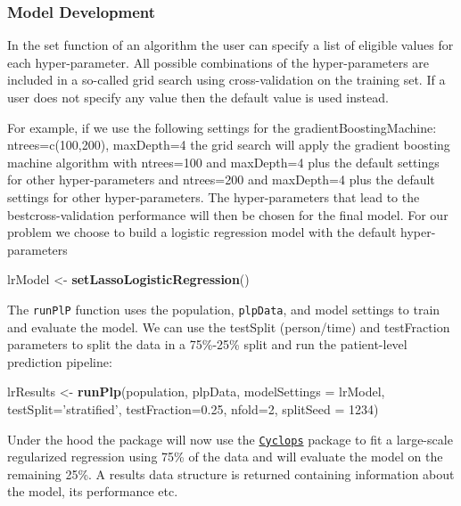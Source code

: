 \documentclass[
]{article}
\newenvironment{Shaded}{\begin{snugshade}}{\end{snugshade}}
\newcommand{\DataTypeTok}[1]{\textcolor[rgb]{0.13,0.29,0.53}{#1}}
\newcommand{\DecValTok}[1]{\textcolor[rgb]{0.00,0.00,0.81}{#1}}
\newcommand{\FloatTok}[1]{\textcolor[rgb]{0.00,0.00,0.81}{#1}}
\newcommand{\KeywordTok}[1]{\textcolor[rgb]{0.13,0.29,0.53}{\textbf{#1}}}
\newcommand{\NormalTok}[1]{#1}
\newcommand{\StringTok}[1]{\textcolor[rgb]{0.31,0.60,0.02}{#1}}
\begin{document}
\hypertarget{model-development}{%
\subsubsection{Model Development}\label{model-development}}

In the set function of an algorithm the user can specify a list of
eligible values for each hyper-parameter. All possible combinations of
the hyper-parameters are included in a so-called grid search using
cross-validation on the training set. If a user does not specify any
value then the default value is used instead.

For example, if we use the following settings for the
gradientBoostingMachine: ntrees=c(100,200), maxDepth=4 the grid search
will apply the gradient boosting machine algorithm with ntrees=100 and
maxDepth=4 plus the default settings for other hyper-parameters and
ntrees=200 and maxDepth=4 plus the default settings for other
hyper-parameters. The hyper-parameters that lead to the
bestcross-validation performance will then be chosen for the final
model. For our problem we choose to build a logistic regression model
with the default hyper-parameters

\begin{Shaded}
\begin{Highlighting}[]
\NormalTok{lrModel <-}\StringTok{ }\KeywordTok{setLassoLogisticRegression}\NormalTok{()}
\end{Highlighting}
\end{Shaded}

The \texttt{runPlP} function uses the population, \texttt{plpData}, and
model settings to train and evaluate the model. We can use the testSplit
(person/time) and testFraction parameters to split the data in a
75\%-25\% split and run the patient-level prediction pipeline:

\begin{Shaded}
\begin{Highlighting}[]
\NormalTok{  lrResults <-}\StringTok{ }\KeywordTok{runPlp}\NormalTok{(population, plpData, }\DataTypeTok{modelSettings =}\NormalTok{ lrModel, }\DataTypeTok{testSplit=}\StringTok{'stratified'}\NormalTok{, }
  \DataTypeTok{testFraction=}\FloatTok{0.25}\NormalTok{, }\DataTypeTok{nfold=}\DecValTok{2}\NormalTok{, }\DataTypeTok{splitSeed =} \DecValTok{1234}\NormalTok{)}
\end{Highlighting}
\end{Shaded}

Under the hood the package will now use the
\href{www.github.com/OHDSI/Cyclops}{\texttt{Cyclops}} package to fit a
large-scale regularized regression using 75\% of the data and will
evaluate the model on the remaining 25\%. A results data structure is
returned containing information about the model, its performance etc.
\end{document}
